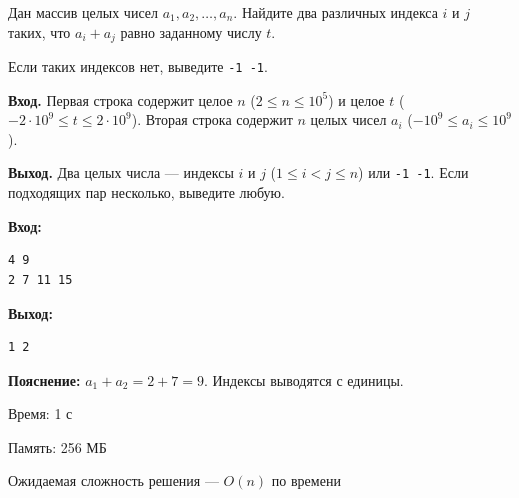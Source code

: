 \begin{problem}
Дан массив целых чисел $a_1, a_2, \ldots, a_n$. Найдите два различных индекса $i$ и $j$ таких, что $a_i + a_j$ равно заданному числу $t$.

Если таких индексов нет, выведите \texttt{-1 -1}.
\end{problem}

\begin{io}
\textbf{Вход.} Первая строка содержит целое $n$ ($2 \leq n \leq 10^5$) и целое $t$ ($-2\cdot10^9 \leq t \leq 2\cdot10^9$). Вторая строка содержит $n$ целых чисел $a_i$ ($-10^9 \leq a_i \leq 10^9$).

\textbf{Выход.} Два целых числа --- индексы $i$ и $j$ ($1 \leq i < j \leq n$) или \texttt{-1 -1}. Если подходящих пар несколько, выведите любую.
\end{io}

\begin{example}
\noindent\textbf{Вход:}
\begin{lstlisting}
4 9
2 7 11 15
\end{lstlisting}
\noindent\textbf{Выход:}
\begin{lstlisting}
1 2
\end{lstlisting}

\smallskip
\noindent\textbf{Пояснение:} $a_1 + a_2 = 2 + 7 = 9$. Индексы выводятся с единицы.
\end{example}

\begin{constraints}
  \item Время: 1 с
  \item Память: 256 МБ
  \item Ожидаемая сложность решения --- $O(n)$ по времени
\end{constraints}
